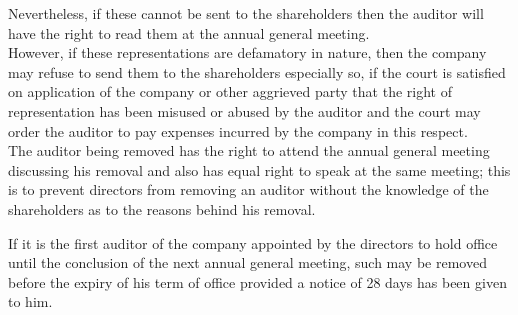 \documentclass[10pt]{article}
\begin{document}
Nevertheless, if these cannot be sent to the shareholders then the auditor will have the right to read them at the annual general meeting.\\
However, if these representations are defamatory in nature, then the company may refuse to send them to the shareholders especially so, if the court is satisfied on application of the company or other aggrieved party that the right of representation has been misused or abused by the auditor and the court may order the auditor to pay expenses incurred by the company in this respect.\\
The auditor being removed has the right to attend the annual general meeting discussing his removal and also has equal right to speak at the same meeting; this is to prevent directors from removing an auditor without the knowledge of the shareholders as to the reasons behind his removal.

If it is the first auditor of the company appointed by the directors to hold office until the conclusion of the next annual general meeting, such may be removed before the expiry of his term of office provided a notice of 28 days has been given to him.
\end{document}
